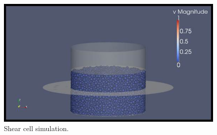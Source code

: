 \begin{figure}[!htb]
\centering
\includegraphics[width=.80\columnwidth]{images/007shearcellsim}
\caption[Shear cell simulation]{Shear cell simulation.}
\label{fig:007shearcellsim}
\end{figure}